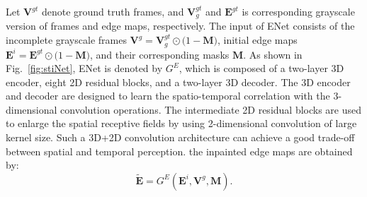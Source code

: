Let $\boldsymbol{V}^{gt}$ denote ground truth frames, and $\boldsymbol{V}_{g}^{gt}$ and  $\boldsymbol{E}^{gt}$ is corresponding grayscale version of frames and edge maps, respectively.
The input of ENet consists of the incomplete grayscale frames $\boldsymbol{V}^{g}=\boldsymbol{V}_{g}^{gt}\odot\big(1-\boldsymbol{M}\big)$, initial edge maps $\boldsymbol{E}^{i}=\boldsymbol{E}^{gt}\odot\big(1-\boldsymbol{M}\big)$, and their corresponding masks $\boldsymbol{M}$.
%
As shown in Fig.~\ref{fig:stiNet}, ENet is denoted by $G^E$, which is composed of a two-layer 3D encoder, eight 2D residual blocks, and a two-layer 3D decoder. 
The 3D encoder and decoder are designed to learn the spatio-temporal correlation with the 3-dimensional convolution operations.
The intermediate 2D residual blocks are used to enlarge the spatial receptive fields by using 2-dimensional convolution of large kernel size.
Such a 3D+2D convolution architecture can achieve a good trade-off between spatial and temporal perception.
the inpainted edge maps are obtained by:
\begin{equation}
	\label{eq:edgenet}
	\boldsymbol{\widetilde{E}}=G^E(\boldsymbol{E}^{i},\boldsymbol{V}^{g},\boldsymbol{M}).
\end{equation}

